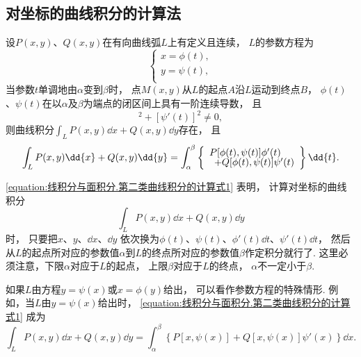 \subsection{对坐标的曲线积分的计算法}
\begin{theorem}
设\(P(x,y)\)、\(Q(x,y)\)在有向曲线弧\(L\)上有定义且连续，
\(L\)的参数方程为\begin{equation*}
	\left\{ \begin{array}{l}
		x = \phi(t), \\
		y = \psi(t), \\
	\end{array} \right.
\end{equation*}
当参数\(t\)单调地由\(\alpha\)变到\(\beta\)时，
点\(M(x,y)\)从\(L\)的起点\(A\)沿\(L\)运动到终点\(B\)，
\(\phi(t)\)、\(\psi(t)\)在以\(\alpha\)及\(\beta\)为端点的闭区间上具有一阶连续导数，
且\begin{equation*}
	[\phi'(t)]^2+[\psi'(t)]^2 \neq 0,
\end{equation*}
则曲线积分\(\int_L{P(x,y)\dd{x} + Q(x,y)\dd{y}}\)存在，
且\begin{equation}\label{equation:线积分与面积分.第二类曲线积分的计算式1}
	\int_L P(x,y) \dd{x} + Q(x,y) \dd{y}
	= \int_\alpha^\beta
		\left\{ \def\arraystretch{.7}\begin{array}{l}
			P[\phi(t),\psi(t)] \phi'(t) \\
			\hspace{5pt}+ Q[\phi(t),\psi(t)] \psi'(t)
		\end{array} \right\} \dd{t}.
\end{equation}
\end{theorem}
\cref{equation:线积分与面积分.第二类曲线积分的计算式1} 表明，
计算对坐标的曲线积分\begin{equation*}
	\int_L P(x,y) \dd{x} + Q(x,y) \dd{y}
\end{equation*}时，
只要把\(x\)、\(y\)、\(\dd{x}\)、\(\dd{y}\)
依次换为\(\phi(t)\)、\(\psi(t)\)、\(\phi'(t) \dd{t}\)、\(\psi'(t) \dd{t}\)，
然后从\(L\)的起点所对应的参数值\(\alpha\)到\(L\)的终点所对应的参数值\(\beta\)作定积分就行了.
这里必须注意，下限\(\alpha\)对应于\(L\)的起点，
上限\(\beta\)对应于\(L\)的终点，
\(\alpha\)不一定小于\(\beta\).

如果\(L\)由方程\(y = \psi(x)\)或\(x = \phi(y)\)给出，
可以看作参数方程的特殊情形.
例如，当\(L\)由\(y = \psi(x)\)给出时，
\cref{equation:线积分与面积分.第二类曲线积分的计算式1} 成为\begin{equation*}
	\int_L P(x,y) \dd{x} + Q(x,y) \dd{y}
	= \int_\alpha^\beta \left\{
		P[x,\psi(x)] + Q[x,\psi(x)] \psi'(x)
	\right\} \dd{x}.
\end{equation*}

